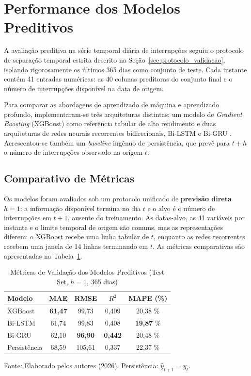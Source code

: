 \section{Performance dos Modelos Preditivos}\label{sec:modelos}
A avaliação preditiva na série temporal diária de interrupções seguiu o protocolo de separação temporal estrita descrito na Seção~\ref{sec:protocolo_validacao}, isolando rigorosamente os últimos 365 dias como conjunto de teste. Cada instante contém 41 entradas numéricas: as 40 colunas preditoras do conjunto final e o número de interrupções disponível na data de origem.

Para comparar as abordagens de aprendizado de máquina e aprendizado profundo, implementaram-se três arquiteturas distintas: um modelo de \textit{Gradient Boosting} (XGBoost) como referência tabular de alto rendimento e duas arquiteturas de redes neurais recorrentes bidirecionais, Bi-LSTM e Bi-GRU \cite{chen2016xgboost, hochreiter1997long, cho2014learning}. Acrescentou-se também um \textit{baseline} ingênuo de persistência, que prevê para $t+h$ o número de interrupções observado na origem $t$.

\subsection{Comparativo de Métricas}
Os modelos foram avaliados sob um protocolo unificado de \textbf{previsão direta $h = 1$}: a informação disponível termina no dia $t$ e o alvo é o número de interrupções em $t+1$, ausente do treinamento. As datas-alvo, as 41 variáveis por instante e o limite temporal de origem são comuns, mas as representações diferem: o XGBoost recebe uma linha tabular de $t$, enquanto as redes recorrentes recebem uma janela de 14 linhas terminando em $t$. As métricas comparativas são apresentadas na Tabela~\ref{tab:metricas_modelos}.

\begin{table}[H]
\caption{Métricas de Validação dos Modelos Preditivos (Test Set, $h = 1$, 365 dias)}
\label{tab:metricas_modelos}
\begin{center}
\begin{tabular}{lcccc}
\toprule
\textbf{Modelo} & \textbf{MAE} & \textbf{RMSE} & \textbf{$R^2$} & \textbf{MAPE (\%)} \\
\midrule
XGBoost & \textbf{61,47} & 99,73 & 0,409 & 20,38 \% \\
Bi-LSTM & 61,74 & 99,83 & 0,408 & \textbf{19,87} \% \\
Bi-GRU  & 62,10 & \textbf{96,90} & \textbf{0,442} & 20,48 \% \\
Persistência & 68,59 & 105,61 & 0,337 & 22,37 \% \\
\bottomrule
\end{tabular}
\end{center}
\small{Fonte: Elaborado pelos autores (2026). Persistência: $\hat{y}_{t+1}=y_t$.}
\end{table}

